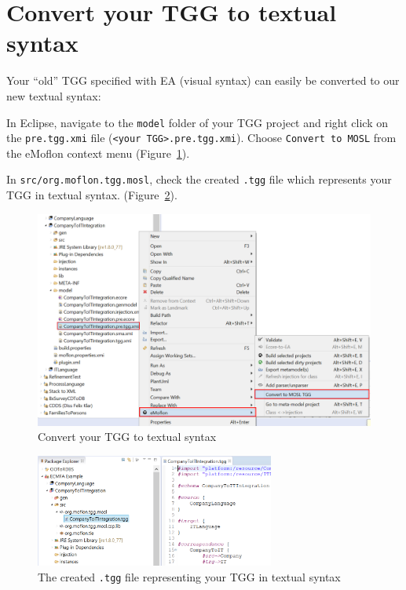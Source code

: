 \newpage

\section{Convert your TGG to textual syntax}
\genHeader

Your ``old'' TGG specified with EA (visual syntax) can easily be
converted to our new textual syntax:

\begin{stepbystep}

\item In Eclipse, navigate to the \texttt{model} folder
of your TGG project and right click on the \texttt{pre.tgg.xmi} file
(\texttt{<your TGG>.pre.tgg.xmi}).
Choose \texttt{Convert to MOSL} from the eMoflon context menu
(Figure~\ref{fig:convertToMOSL}).


\item In \texttt{src/org.moflon.tgg.mosl}, check the
created \texttt{.tgg} file which represents your TGG in textual syntax.
(Figure~\ref{fig:tggfile}).
\end{stepbystep}

\begin{figure}[h]
\begin{center}
 	\includegraphics[width=\textwidth]{convertToMOSL}
	\caption{Convert your TGG to textual syntax}
  	\label{fig:convertToMOSL}
\end{center}

\end{figure}
\begin{figure}[h]
\begin{center}
 	\includegraphics[width=0.7\textwidth]{tggfile}
	\caption{The created \texttt{.tgg} file representing your TGG in textual
	syntax}
  	\label{fig:tggfile}
\end{center}
\end{figure}